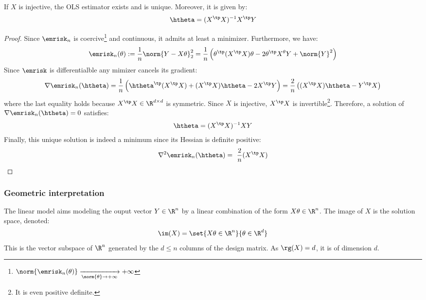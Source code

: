 \documentclass[toc]{../cs-classes/cs-classes}
\begin{document}
\begin{property}
    \label{prop:closed-form-OLS}
    If $X$ is injective, the OLS estimator exists and is unique. Moreover, it is given by:
    \begin{equation}
        \label{eq:closed-form-OLS}
        \htheta = (X^\tp X)^{-1}X^\tp Y
    \end{equation}
\end{property}

\begin{proof}
    Since $\emrisk_n$ is coercive\footnote{$\norm{\emrisk_n(\theta)} \xrightarrow[\norm{\theta}\to+\infty]{} +\infty$} and continuous, it admits at least a minimizer. Furthermore, we have:
    \begin{equation*}
        \emrisk_n(\theta) := \frac{1}{n}\norm{Y-X\theta}^2_2 = \frac{1}{n}\left(\theta^\tp(X^\tp X)\theta - 2\theta^\tp X^\theta Y+\norm{Y}^2\right)
    \end{equation*}
    Since $\emrisk$ is differentialble any mimizer cancels its gradient:
    \begin{equation*}
        \nabla\emrisk_n(\htheta) = \frac{1}{n}\left(\htheta^\tp(X^\tp X) + (X^\tp X)\htheta - 2X^\tp Y\right) = \frac{2}{n}\left((X^\tp X)\htheta - Y^\tp X\right)
    \end{equation*}
    where the last equality holds because $X^\tp X\in\R^{d\times d}$ is symmetric. Since $X$ is injective, $X^\tp X$ is invertible\footnote{It is even positive definite.}. Therefore, a solution of $\nabla\emrisk_n(\htheta)=0$ satisfies:
    \begin{equation*}
        \htheta = (X^\tp X)^{-1}XY
    \end{equation*}
    Finally, this unique solution is indeed a minimum since its Hessian is definite positive:
    \begin{equation*}
        \nabla^2\emrisk_n(\htheta) = \frac{2}{n}(X^\tp X)
    \end{equation*}
\end{proof}

\subsubsection{Geometric interpretation}
The linear model aims modeling the ouput vector $Y\in\R^n$ by a linear combination of the form $X\theta\in\R^n$. The image of $X$ is the solution space, denoted:
\begin{equation*}
    \im(X)=\set{X\theta\in\R^n}{\theta\in\R^d}
\end{equation*}
This is the vector subspace of $\R^n$ generated by the $d\leq n$ columns of the design matrix. As $\rg(X)=d$, it is of dimension $d$.
\end{document}
